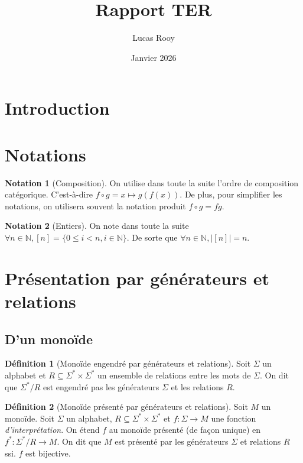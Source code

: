 \documentclass{article}
\title{Rapport TER}
\author{Lucas Rooy}
\date{Janvier 2026}
\theoremstyle{definition}
\newtheorem{notation}{Notation}[section]
\theoremstyle{definition}
\newtheorem{definition}{Définition}[section]
\theoremstyle{remark}
\begin{document}
\maketitle

\section{Introduction}

\section{Notations}
\begin{notation}[Composition]
    On utilise dans toute la suite l'ordre de composition catégorique. C'est-à-dire $f\circ g =x\mapsto g(f(x))$.
    De plus, pour simplifier les notations, on utilisera souvent la notation produit $f\circ g = f g$.
\end{notation}
\begin{notation}[Entiers]
On note dans toute la suite $\forall n\in \mathbb N, [n] = \{0\leq i < n, i\in\mathbb N\}$. De sorte que $\forall n \in \mathbb N, |[n]| = n$.
\end{notation}

\section{Présentation par générateurs et relations}
\subsection{D'un monoïde}

\begin{definition}[Monoïde engendré par générateurs et relations]
Soit $\Sigma$ un alphabet et $R \subseteq \Sigma^* \times \Sigma^*$ un ensemble de relations entre les mots de $\Sigma$.
On dit que $\Sigma^*/R$ est engendré pas les générateurs $\Sigma$ et les relations $R$.
\end{definition}

\begin{definition}[Monoïde présenté par générateurs et relations]
Soit $M$ un monoïde. Soit $\Sigma$ un alphabet, $R \subseteq \Sigma^* \times \Sigma^*$ et $f:\Sigma \to M$ une fonction \textit{d'interprétation}.
On étend $f$ au monoïde présenté (de façon unique) en $f^*:\Sigma^*/R \to M$.
On dit que $M$ est présenté par les générateurs $\Sigma$ et relations $R$ ssi. $f$ est bijective. 
\end{definition}
\end{document}
